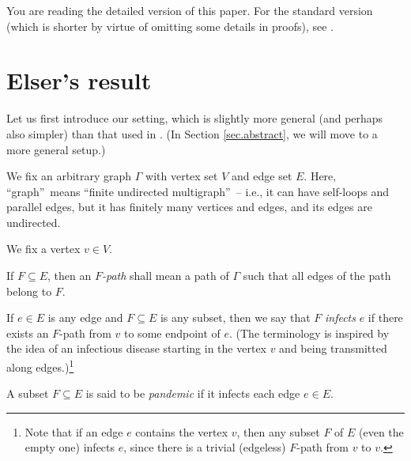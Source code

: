 \documentclass[numbers=enddot,12pt,final,onecolumn]{scrartcl}%
\theoremstyle{definition}
\newenvironment{verlong}{}{}
\begin{document}
\begin{verlong}
You are reading the detailed version of this paper. For the standard version
(which is shorter by virtue of omitting some details in proofs), see
\cite{vershort}.
\end{verlong}

\section{\label{sec.elser}Elser's result}

Let us first introduce our setting, which is slightly more general (and
perhaps also simpler) than that used in \cite{Elser84}. (In Section
\ref{sec.abstract}, we will move to a more general setup.)

We fix an arbitrary graph $\Gamma$ with vertex set $V$ and edge set $E$. Here,
\textquotedblleft graph\textquotedblright\ means \textquotedblleft finite
undirected multigraph\textquotedblright\ -- i.e., it can have self-loops and
parallel edges, but it has finitely many vertices and edges, and its edges are undirected.

We fix a vertex $v\in V$.

If $F\subseteq E$, then an $F$\emph{-path} shall mean a path of $\Gamma$ such
that all edges of the path belong to $F$.

If $e\in E$ is any edge and $F\subseteq E$ is any subset, then we say that $F$
\emph{infects }$e$ if there exists an $F$-path from $v$ to some endpoint of
$e$. (The terminology is inspired by the idea of an infectious disease
starting in the vertex $v$ and being transmitted along edges.)\footnote{Note
that if an edge $e$ contains the vertex $v$, then any subset $F$ of $E$ (even
the empty one) infects $e$, since there is a trivial (edgeless) $F$-path from
$v$ to $v$.}

A subset $F\subseteq E$ is said to be \emph{pandemic} if it infects each edge
$e\in E$.
\end{document}
